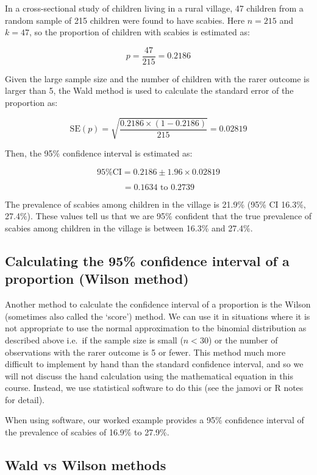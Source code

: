 \documentclass[
  a4paper,
]{memoir}
\begin{document}
In a cross-sectional study of children living in a rural village, 47
children from a random sample of 215 children were found to have
scabies. Here \(n=215\) and \(k=47\), so the proportion of children with
scabies is estimated as:

\[ p = \frac{47}{215} = 0.2186 \]

Given the large sample size and the number of children with the rarer
outcome is larger than 5, the Wald method is used to calculate the
standard error of the proportion as:

\[{\text{SE}\left( p \right) = \sqrt{\frac{0.2186 \times (1 - 0.2186)}{215}}
}{= 0.02819}\]

Then, the 95\% confidence interval is estimated as:

\[\text{95\% CI} = 0.2186 \pm 1.96 \times 0.02819\]

\[= 0.1634 \text{ to } 0.2739\]

The prevalence of scabies among children in the village is 21.9\% (95\%
CI 16.3\%, 27.4\%). These values tell us that we are 95\% confident that
the true prevalence of scabies among children in the village is between
16.3\% and 27.4\%.

\subsection{Calculating the 95\% confidence interval of a proportion
(Wilson
method)}\label{calculating-the-95-confidence-interval-of-a-proportion-wilson-method}

Another method to calculate the confidence interval of a proportion is
the Wilson (sometimes also called the `score') method. We can use it in
situations where it is not appropriate to use the normal approximation
to the binomial distribution as described above i.e.~if the sample size
is small (\(n < 30\)) or the number of observations with the rarer
outcome is 5 or fewer. This method much more difficult to implement by
hand than the standard confidence interval, and so we will not discuss
the hand calculation using the mathematical equation in this course.
Instead, we use statistical software to do this (see the jamovi or R
notes for detail).

When using software, our worked example provides a 95\% confidence
interval of the prevalence of scabies of 16.9\% to 27.9\%.

\subsection{Wald vs Wilson methods}\label{wald-vs-wilson-methods}
\end{document}
